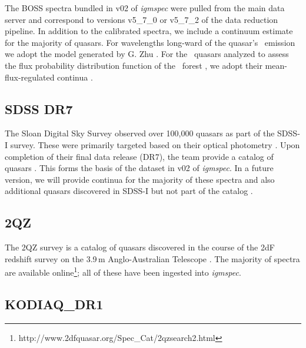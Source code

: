 \documentclass[12pt]{elsarticle}
\begin{document}
The BOSS spectra bundled in v02 of {\it igmspec} were pulled
from the main data server and correspond to versions 
v5\_7\_0 or v5\_7\_2 of the data reduction pipeline.
In addition to the calibrated spectra, we include a
continuum estimate for the majority of quasars.  
For wavelengths long-ward of the quasar's \lya\ emission we adopt
the model generated by G. Zhu 
\citep[see][for details on the algorithm]{zhu+14}.
For the \nlee~quasars analyzed to assess
the flux probability distribution function of the 
\lya\ forest \cite{lee+13}, we adopt their mean-flux-regulated continua
\citep{lee+12}.

%
\subsection{SDSS DR7}
\label{sec:dr7}

The Sloan Digital Sky Survey observed over 100,000 quasars
as part of the SDSS-I survey.  These were primarily targeted
based on their optical photometry \citep[e.g.][]{richards09}.  
Upon completion of their final data release (DR7),
the team provide a catalog of quasars \citep{sdss_qso_dr7}.
This forms the basis of the dataset in v02 of {\it igmspec}.
In a future version, we will provide continua for the majority
of these spectra and also additional quasars discovered in 
SDSS-I but not part of the catalog \cite{sdss_qso_dr7}.



\subsection{2QZ}
\label{sec:2qz}

The 2QZ survey is a catalog of quasars discovered in the 
course of the 2dF redshift survey on the 3.9\,m
Anglo-Australian Telescope \citep{croom01}.  The
majority of spectra are available online\footnote{http://www.2dfquasar.org/Spec\_Cat/2qzsearch2.html};
all of these have been ingested into {\it igmspec}.


\subsection{KODIAQ\_DR1}
\label{sec:kodiaq}
\end{document}
